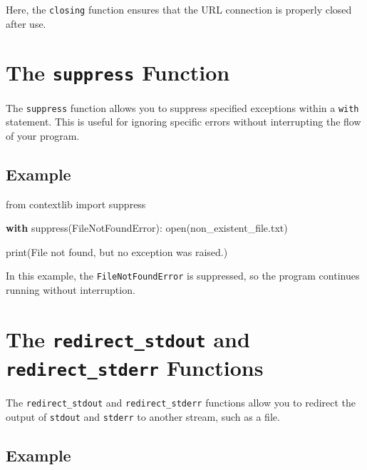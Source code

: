 \documentclass[
  letterpaper,
  DIV=11,
  numbers=noendperiod]{scrreprt}
\newenvironment{Shaded}{\begin{snugshade}}{\end{snugshade}}
\newcommand{\BuiltInTok}[1]{\textcolor[rgb]{0.00,0.23,0.31}{#1}}
\newcommand{\ControlFlowTok}[1]{\textcolor[rgb]{0.00,0.23,0.31}{\textbf{#1}}}
\newcommand{\ImportTok}[1]{\textcolor[rgb]{0.00,0.46,0.62}{#1}}
\newcommand{\NormalTok}[1]{\textcolor[rgb]{0.00,0.23,0.31}{#1}}
\newcommand{\PreprocessorTok}[1]{\textcolor[rgb]{0.68,0.00,0.00}{#1}}
\newcommand{\StringTok}[1]{\textcolor[rgb]{0.13,0.47,0.30}{#1}}
\begin{document}
Here, the \texttt{closing} function ensures that the URL connection is
properly closed after use.

\section{\texorpdfstring{The \texttt{suppress}
Function}{The suppress Function}}\label{the-suppress-function}

The \texttt{suppress} function allows you to suppress specified
exceptions within a \texttt{with} statement. This is useful for ignoring
specific errors without interrupting the flow of your program.

\subsection{Example}\label{example-32}

\begin{Shaded}
\begin{Highlighting}[]
\ImportTok{from}\NormalTok{ contextlib }\ImportTok{import}\NormalTok{ suppress}

\ControlFlowTok{with}\NormalTok{ suppress(}\PreprocessorTok{FileNotFoundError}\NormalTok{):}
    \BuiltInTok{open}\NormalTok{(}\StringTok{\textquotesingle{}non\_existent\_file.txt\textquotesingle{}}\NormalTok{)}

\BuiltInTok{print}\NormalTok{(}\StringTok{\textquotesingle{}File not found, but no exception was raised.\textquotesingle{}}\NormalTok{)}
\end{Highlighting}
\end{Shaded}

In this example, the \texttt{FileNotFoundError} is suppressed, so the
program continues running without interruption.

\section{\texorpdfstring{The \texttt{redirect\_stdout} and
\texttt{redirect\_stderr}
Functions}{The redirect\_stdout and redirect\_stderr Functions}}\label{the-redirect_stdout-and-redirect_stderr-functions}

The \texttt{redirect\_stdout} and \texttt{redirect\_stderr} functions
allow you to redirect the output of \texttt{stdout} and \texttt{stderr}
to another stream, such as a file.

\subsection{Example}\label{example-33}
\end{document}
